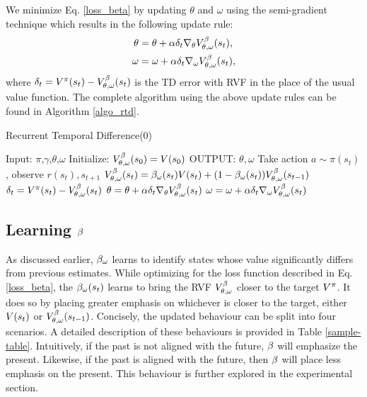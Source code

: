 We minimize Eq. \ref{loss_beta} by updating $\theta$ and $\omega$ using the semi-gradient technique which results in the following update rule:
\begin{equation}
\begin{split}
	\theta &= \theta + \alpha \delta_t  \nabla_{\theta} V^{\beta}_{\theta,\omega} (s_t), \\
	\omega &= \omega + \alpha \delta_t  \nabla_{\omega} V^{\beta}_{\theta,\omega} (s_t),
\end{split}
\end{equation}
where $\delta_t = V^{\pi}(s_t) - V^{\beta}_{\theta,\omega}(s_t)$ is the TD error with RVF in the place of the usual value function. The complete algorithm using the above update rules can be found in Algorithm \ref{algo_rtd}.

\begin{algorithm}[H]
\caption{Recurrent Temporal Difference(0)}
\begin{algorithmic}[1]
    \label{RTD}
    \STATE Input: $\pi$,$\gamma$,$\theta$,$\omega$
    \STATE Initialize: $V^{\beta}_{\theta,\omega}(s_0) = V(s_0)$
    \STATE OUTPUT: $\theta,\omega$ 
        \STATE Take action $a \sim \pi(s_t)$ , observe $r(s_t),s_{t+1}$
        \STATE $V^{\beta}_{\theta,\omega}(s_t) = \beta_{\omega}(s_t) V(s_t) + (1-\beta_{\omega}(s_t)) V^{\beta}_{\theta,\omega} (s_{t-1})$ 
        \STATE $\delta_t = V^{\pi}(s_t) - V^{\beta}_{\theta,\omega}(s_t)$ 
        \STATE $\theta = \theta + \alpha \delta_t \nabla_{\theta} V^{\beta}_{\theta,\omega}(s_t) $ 
        \STATE $\omega = \omega + \alpha \delta_t \nabla_{\omega} V^{\beta}_{\theta,\omega}(s_t)$ 
    \ENDFOR
\end{algorithmic}
\label{algo_rtd}
\end{algorithm}

\subsection{Learning $\beta$}
As discussed earlier, $\beta_{\omega}$ learns to identify states whose value significantly differs from previous estimates. While optimizing for the loss function described in Eq. \ref{loss_beta}, the $\beta_{\omega}(s_t)$ learns to bring the RVF $V^{\beta}_{\theta,\omega}$ closer to the target $V^{\pi}$. It does so by placing greater emphasis on whichever is closer to the target, either $V(s_t)$ or $V^{\beta}_{\theta,\omega}(s_{t-1})$. Concisely, the updated behaviour can be split into four scenarios. A detailed description of these behaviours is provided in Table \ref{sample-table}. Intuitively, if the past is not aligned with the future, $\beta$ will emphasize the present. Likewise, if the past is aligned with the future, then $\beta$ will place less emphasis on the present. This behaviour is further explored in the experimental section.

